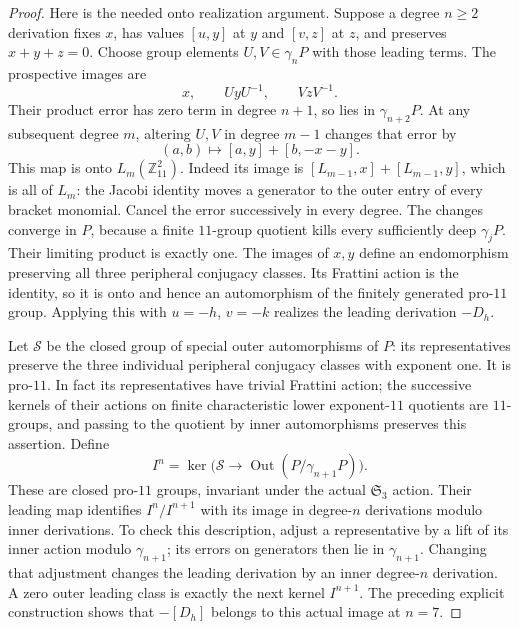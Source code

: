 \begin{proof}
Here is the needed onto realization argument.  Suppose a degree
\(n\ge2\) derivation fixes \(x\), has values \([u,y]\)
at \(y\) and \([v,z]\) at \(z\), and preserves
\(x+y+z=0\).  Choose group elements \(U,V\in\gamma_nP\)
with those leading terms.  The prospective images are
\[
             x,\qquad UyU^{-1},\qquad VzV^{-1}.
\]
Their product error has zero term in degree \(n+1\), so lies
in \(\gamma_{n+2}P\).  At any subsequent degree \(m\),
altering \(U,V\) in degree \(m-1\) changes that error by
\[
(a,b)\longmapsto[a,y]+[b,-x-y].
\tag{E.197.7}
\]
This map is onto \(L_m(\mathbb Z_{11}^2)\).  Indeed its image
is \([L_{m-1},x]+[L_{m-1},y]\), which is all of \(L_m\):
the Jacobi identity moves a generator to the outer entry of
every bracket monomial.  Cancel the error successively in every
degree.  The changes converge in \(P\), because a finite
\(11\)-group quotient kills every sufficiently deep
\(\gamma_jP\).  Their limiting product is exactly one.
The images of \(x,y\) define an endomorphism preserving all
three peripheral conjugacy classes.  Its Frattini action is the
identity, so it is onto and hence an automorphism of the finitely
generated pro-\(11\) group.  Applying this with \(u=-h\),
\(v=-k\) realizes the leading derivation \(-D_h\).

Let \(\mathcal S\) be the closed group of special outer
automorphisms of \(P\): its representatives preserve the three
individual peripheral conjugacy classes with exponent one.
It is pro-\(11\).  In fact its representatives have trivial
Frattini action; the successive kernels of their actions on
finite characteristic lower exponent-\(11\) quotients are
\(11\)-groups, and passing to the quotient by inner
automorphisms preserves this assertion.  Define
\[
 I^n=\ker\bigl(\mathcal S\longrightarrow
                   \operatorname{Out}(P/\gamma_{n+1}P)\bigr).
\]
These are closed pro-\(11\) groups, invariant under the actual
\(\mathfrak S_3\) action.  Their leading map identifies
\(I^n/I^{n+1}\) with its image in degree-\(n\) derivations
modulo inner derivations.  To check this description, adjust a
representative by a lift of its inner action modulo
\(\gamma_{n+1}\); its errors on generators then lie in
\(\gamma_{n+1}\).  Changing that adjustment changes the leading
derivation by an inner degree-\(n\) derivation.  A zero outer
leading class is exactly the next kernel \(I^{n+1}\).
The preceding explicit construction shows that
\(-[D_h]\) belongs to this actual image at \(n=7\).


\end{proof}
